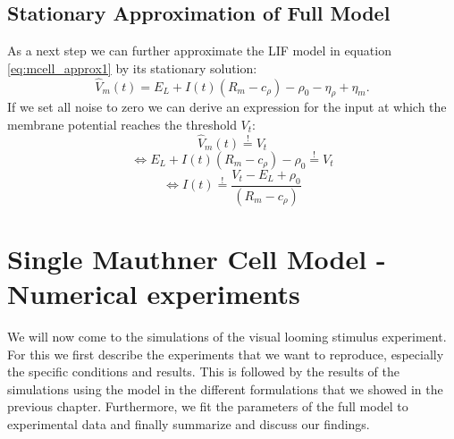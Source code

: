 \documentclass[a4paper,10pt,hidelinks]{scrreprt}
\begin{document}
	\section{Stationary Approximation of Full Model}\label{approx full model}
	As a next step we can further approximate the LIF model in equation \ref{eq:mcell_approx1} by 
	its stationary solution:
	\begin{equation}
	\hat{V}_m(t) = E_{L} + I(t)(R_{m} - c_{\rho}) - \rho_{0} - 
	\eta_{\rho} +  \eta _m.
	\end{equation}
	If we set all noise to zero we can derive an expression for the input at which the membrane 
	potential reaches the threshold $V_{t}$:
	\begin{equation}
	\hat{V}_m(t) \overset{!}{=} V_t
	\end{equation}
	\begin{equation}
	\Leftrightarrow E_{L} + I(t)(R_{m} - c_{\rho}) - \rho_{0} 
	\overset{!}{=} V_t
	\end{equation}
	\begin{equation}
	\Leftrightarrow I(t)
	\overset{!}{=} \frac{V_t - E_{L} + \rho_{0}}{(R_{m} - c_{\rho})}
	\label{eq:crit_input}
	\end{equation}

	\chapter{Single Mauthner Cell Model - Numerical experiments}\label{ch:expm}
	We will now come to the simulations of the visual looming stimulus experiment.
	For this we first describe the experiments that we want to reproduce, especially the specific 
	conditions and results.
	This is followed by the results of the simulations using the model in the different 
	formulations that we showed in the previous chapter.
	Furthermore, we fit the parameters of the full model to experimental data and finally summarize 
	and discuss our findings.
\end{document}
